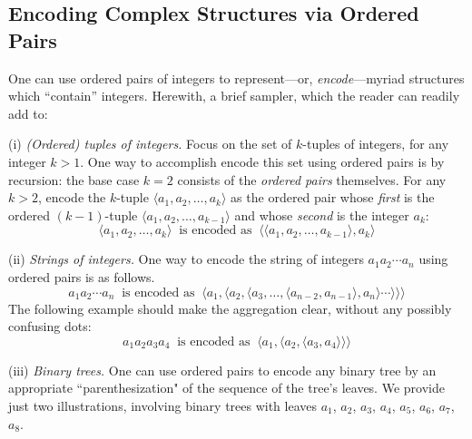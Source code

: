 \subsection{Encoding Complex Structures via Ordered Pairs}
\label{sec:encodings-via-ordered-pairs}

One can use ordered pairs of integers to represent---or, {\it encode}---myriad structures which ``contain'' integers.  Herewith, a brief sampler, which the reader can readily add to:


\medskip

\noindent
(i) {\em (Ordered) tuples of integers.}
Focus on the set of $k$-tuples of integers, for any integer $k > 1$.  One way to accomplish encode this set using ordered pairs is by recursion:  the base case $k=2$ consists of the {\em ordered pairs} themselves.  For any $k > 2$, encode the $k$-tuple $\langle a_1, a_2, \ldots, a_k \rangle$ as the ordered pair whose {\em first} is the ordered $(k-1)$-tuple $\langle a_1, a_2, \ldots, a_{k-1} \rangle$ and whose {\em second} is the integer $a_k$:
\[ \langle a_1, a_2, \ldots, a_k \rangle \ \mbox{ is encoded as } \
\langle \langle a_1, a_2, \ldots, a_{k-1} \rangle, a_k \rangle \]


\medskip

\noindent
(ii) {\em Strings of integers.}
One way to encode the string of integers $a_1 a_2 \cdots a_n$ using ordered pairs is as follows.
\[ a_1 a_2 \cdots a_n \  \mbox{ is encoded as } \
\langle a_1, \langle a_2, \langle a_3, \ldots, \langle a_{n-2},  a_{n-1}
\rangle, a_n \rangle \cdots \rangle \rangle \rangle \]
The following example should make the aggregation clear, without any possibly confusing dots:
\[ a_1 a_2 a_3 a_4 \ \mbox{ is encoded as } \
\langle a_1, \langle a_2, \langle a_3,  a_4 \rangle \rangle \rangle \]

\index{integer!binary tree!via ordered pairs}

\medskip


\noindent
(iii) {\em Binary trees.}
One can use ordered pairs to encode any binary tree by an appropriate ``parenthesization" of the sequence of the tree's leaves.  We provide just two illustrations, involving binary trees with leaves $a_1$, $a_2$, $a_3$, $a_4$, $a_5$, $a_6$, $a_7$, $a_8$.

